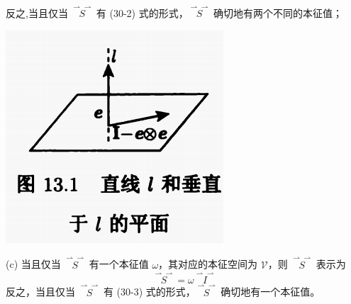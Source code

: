 \documentclass[12pt, a4paper, oneside, UTF8]{ctexbook}  %
\newcommand{\vvec}{\overset{\rightharpoonup\!\!\!\! \rightharpoonup}}
\begin{document}
\begin{defn}
\begin{flushleft}
\begin{minipage}[t]{0.7\textwidth}
    反之,当且仅当 $\vvec{S}$ 有 (30-2) 式的形式，$\vvec{S}$ 确切地有两个不同的本征值；   
    \end{minipage}
    \begin{minipage}[t]{0.25\textwidth}
        \vspace{0pt}    
        \centering
        \includegraphics[width=1\linewidth]{chap4/13.1.png}
        \label{image13.1}
    \end{minipage}
\end{flushleft}

    (c) 当且仅当 $\vvec{S}$ 有一个本征值 $\omega$，其对应的本征空间为 $\mathcal{V}$，则 $\vvec{S}$ 表示为
    \[
    \vvec{S} = \omega \vvec{I}
    \tag{30-3}
    \]
    反之，当且仅当 $\vvec{S}$ 有 (30-3) 式的形式，$\vvec{S}$ 确切地有一个本征值。
\end{defn}
\end{document}
